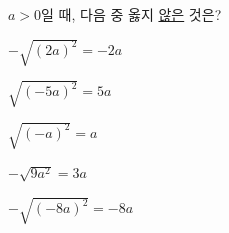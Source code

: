 $a>0$일 때, 다음 중 옳지 \underline{않은} 것은?
\begin{choicesii}{\rule[-3ex]{0pt}{8ex}$-\sqrt{(2a)^2}=-2a$}{\rule[-3ex]{0pt}{8ex}$\sqrt{(-5a)^2}=5a$}{\rule[-3ex]{0pt}{8ex}$\sqrt{(-a)^2}=a$}{\rule[-3ex]{0pt}{8ex}$-\sqrt{9a^2}=3a$}{\rule[-3ex]{0pt}{8ex}$-\sqrt{(-8a)^2}=-8a$}\end{choicesii}
